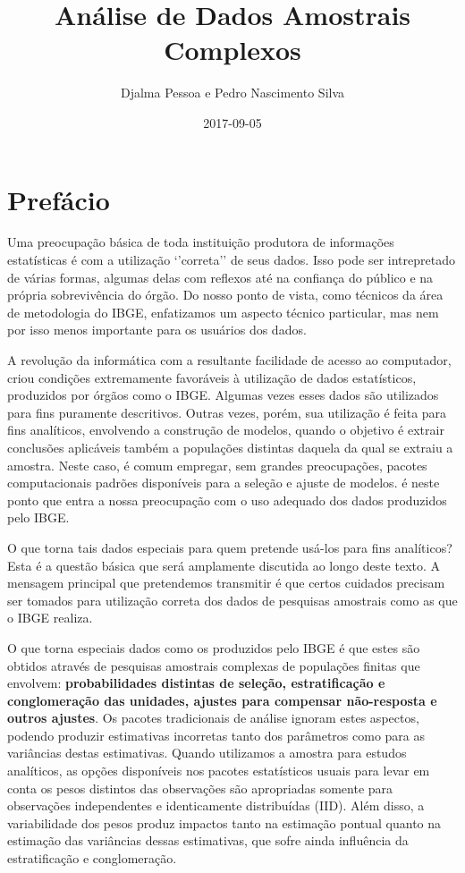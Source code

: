 \documentclass[]{book}
\title{Análise de Dados Amostrais Complexos}
\author{Djalma Pessoa e Pedro Nascimento Silva}
\date{2017-09-05}
\theoremstyle{definition}
\theoremstyle{definition}
\theoremstyle{definition}
\theoremstyle{remark}
\begin{document}
\maketitle

{
\setcounter{tocdepth}{1}
\tableofcontents
}
\chapter*{Prefácio}\label{prefacio}

Uma preocupação básica de toda instituição produtora de informações
estatísticas é com a utilização `'correta'' de seus dados. Isso pode ser
intrepretado de várias formas, algumas delas com reflexos até na
confiança do público e na própria sobrevivência do órgão. Do nosso ponto
de vista, como técnicos da área de metodologia do IBGE, enfatizamos um
aspecto técnico particular, mas nem por isso menos importante para os
usuários dos dados.

A revolução da informática com a resultante facilidade de acesso ao
computador, criou condições extremamente favoráveis à utilização de
dados estatísticos, produzidos por órgãos como o IBGE. Algumas vezes
esses dados são utilizados para fins puramente descritivos. Outras
vezes, porém, sua utilização é feita para fins analíticos, envolvendo a
construção de modelos, quando o objetivo é extrair conclusões aplicáveis
também a populações distintas daquela da qual se extraiu a amostra.
Neste caso, é comum empregar, sem grandes preocupações, pacotes
computacionais padrões disponíveis para a seleção e ajuste de modelos. é
neste ponto que entra a nossa preocupação com o uso adequado dos dados
produzidos pelo IBGE.

O que torna tais dados especiais para quem pretende usá-los para fins
analíticos? Esta é a questão básica que será amplamente discutida ao
longo deste texto. A mensagem principal que pretendemos transmitir é que
certos cuidados precisam ser tomados para utilização correta dos dados
de pesquisas amostrais como as que o IBGE realiza.

O que torna especiais dados como os produzidos pelo IBGE é que estes são
obtidos através de pesquisas amostrais complexas de populações finitas
que envolvem: \textbf{probabilidades distintas de seleção,
estratificação e conglomeração das unidades, ajustes para compensar
não-resposta e outros ajustes}. Os pacotes tradicionais de análise
ignoram estes aspectos, podendo produzir estimativas incorretas tanto
dos parâmetros como para as variâncias destas estimativas. Quando
utilizamos a amostra para estudos analíticos, as opções disponíveis nos
pacotes estatísticos usuais para levar em conta os pesos distintos das
observações são apropriadas somente para observações independentes e
identicamente distribuídas (IID). Além disso, a variabilidade dos pesos
produz impactos tanto na estimação pontual quanto na estimação das
variâncias dessas estimativas, que sofre ainda influência da
estratificação e conglomeração.
\end{document}
